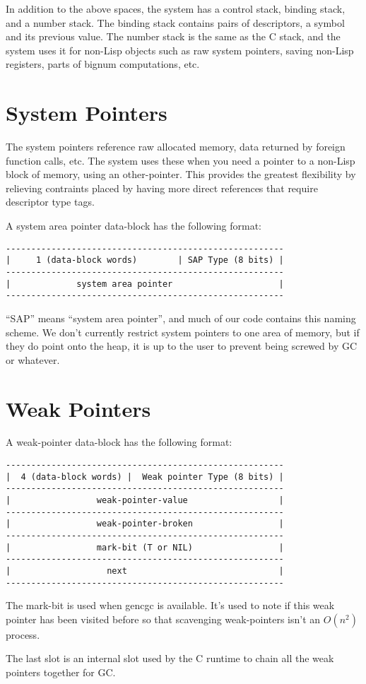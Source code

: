 In addition to the above spaces, the system has a control stack, binding stack,
and a number stack.  The binding stack contains pairs of descriptors, a symbol
and its previous value.  The number stack is the same as the C stack, and the
system uses it for non-Lisp objects such as raw system pointers, saving
non-Lisp registers, parts of bignum computations, etc.



\section{System Pointers}

The system pointers reference raw allocated memory, data returned by foreign
function calls, etc.  The system uses these when you need a pointer to a
non-Lisp block of memory, using an other-pointer.  This provides the greatest
flexibility by relieving contraints placed by having more direct references
that require descriptor type tags.

A system area pointer data-block has the following format:
\begin{verbatim}
-------------------------------------------------------
|     1 (data-block words)        | SAP Type (8 bits) |
-------------------------------------------------------
|             system area pointer                     |
-------------------------------------------------------
\end{verbatim}

``SAP'' means ``system area pointer'', and much of our code contains this naming
scheme.  We don't currently restrict system pointers to one area of memory, but
if they do point onto the heap, it is up to the user to prevent being screwed
by GC or whatever.

\section{Weak Pointers}
\label{sec:weak-pointers}

A weak-pointer data-block has the following format:
\begin{verbatim}
-------------------------------------------------------
|  4 (data-block words) |  Weak pointer Type (8 bits) |
-------------------------------------------------------
|                 weak-pointer-value                  |
-------------------------------------------------------
|                 weak-pointer-broken                 |
-------------------------------------------------------
|                 mark-bit (T or NIL)                 |
-------------------------------------------------------
|                   next                              |
-------------------------------------------------------
\end{verbatim}

The mark-bit is used when gencgc is available.  It's used to note if
this weak pointer has been visited before so that scavenging
weak-pointers isn't an $O(n^2)$ process.

The last slot is an internal slot used by the C runtime to chain all
the weak pointers together for GC.


